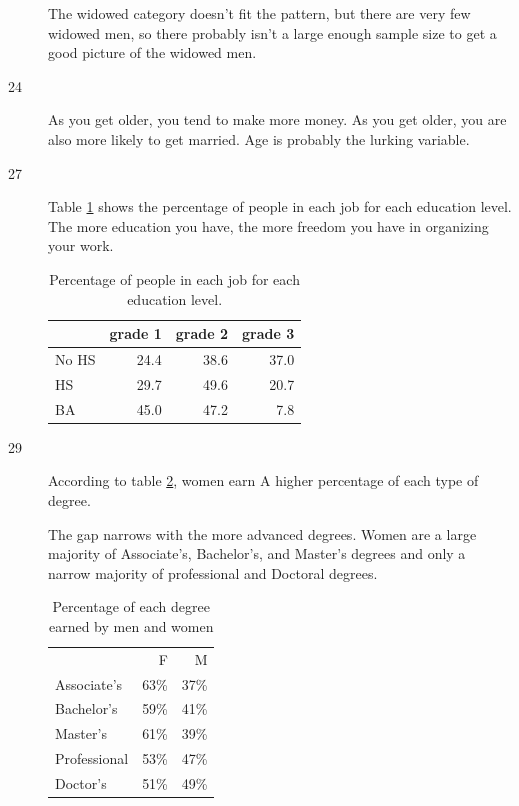 \documentclass[letterpaper, landscape]{exam}
\begin{document}
\begin{description}
\begin{parts}
          The widowed category doesn't fit the pattern, but there are very few
          widowed men, so there probably isn't a large enough sample size to get a
          good picture of the widowed men.

      \end{parts}

    \item[24] As you get older, you tend to make more money.  As you get older, you
      are also more likely to get married.  Age is probably the lurking variable.

    \item[27]
      Table \ref{tab:ex27} shows the percentage of people in each job for each
      education level.  The more education you have, the more freedom you have
      in organizing your work.

      \begin{table}[H]
        \centering
        \begin{tabular}{lrrr}
          \toprule
                & grade 1 & grade 2 & grade 3     \\
          \midrule
          No HS & 24.4    & 38.6    & 37.0 \\
          HS    & 29.7    & 49.6    & 20.7 \\
          BA    & 45.0    & 47.2    & 7.8  \\
          \bottomrule
        \end{tabular}
        \caption{Percentage of people in each job for each education level.}
        \label{tab:ex27}
      \end{table}

    \newpage

    \item[29]
      According to table \ref{tab:ex29}, women earn A higher percentage of each
      type of degree.  
      
      The gap narrows with the more advanced degrees. Women are a large majority
      of Associate's, Bachelor's, and Master's degrees and only a narrow
      majority of professional and Doctoral degrees.

      \begin{table}[H]
        \centering
        \begin{tabular}{lrr}
          \toprule
          \midrule
                       & F    & M \\
          Associate's  & 63\% & 37\% \\
          Bachelor's   & 59\% & 41\% \\
          Master's     & 61\% & 39\% \\
          Professional & 53\% & 47\% \\
          Doctor's     & 51\% & 49\% \\
          \bottomrule
        \end{tabular}
        \caption{Percentage of each degree earned by men and women}
        \label{tab:ex29}
      \end{table}


\end{description}
\end{document}
